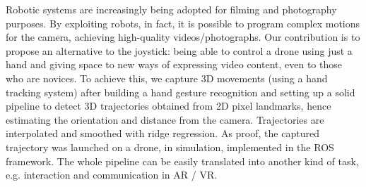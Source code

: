 Robotic systems are increasingly being adopted for filming and photography purposes. By exploiting robots, in fact, it is possible to program complex motions for the camera, achieving high-quality videos/photographs. Our contribution is to propose an alternative to the joystick: being able to control a drone using just a hand and giving space to new ways of expressing video content, even to those who are novices. To achieve this, we capture 3D movements (using a hand tracking system) after building a hand gesture recognition and setting up a solid pipeline to detect 3D trajectories obtained from 2D pixel landmarks, hence estimating the orientation and distance from the camera. Trajectories are interpolated and smoothed with ridge regression. As proof, the captured trajectory was launched on a drone, in simulation, implemented in the ROS framework. The whole pipeline can be easily translated into another kind of task, e.g. interaction and communication in AR / VR.